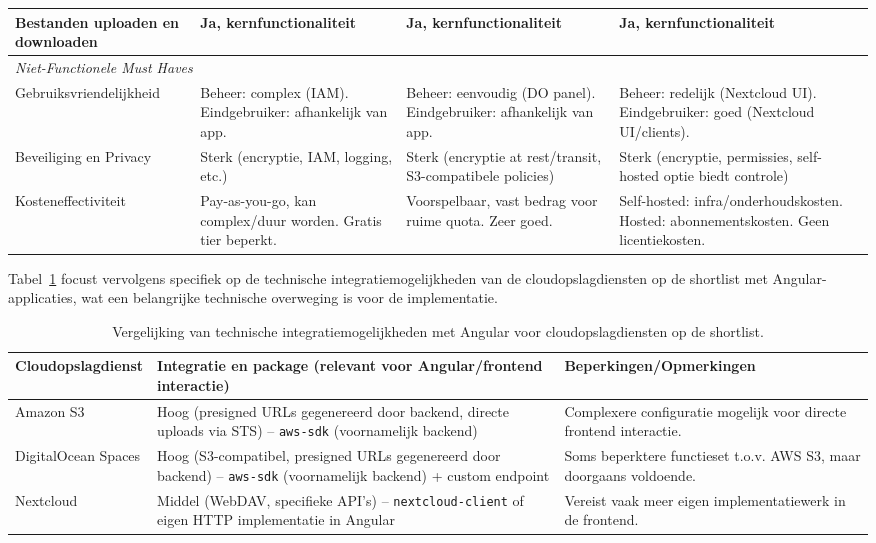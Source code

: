 \begin{table}[htbp]
\begin{tabularx}{\textwidth}{l >{\raggedright\arraybackslash}X >{\raggedright\arraybackslash}X >{\raggedright\arraybackslash}X}
      \midrule
      Bestanden uploaden en downloaden & Ja, kernfunctionaliteit & Ja, kernfunctionaliteit & Ja, kernfunctionaliteit \\
      \midrule
      \multicolumn{4}{l}{\textit{Niet-Functionele Must Haves}} \\
      Gebruiksvriendelijkheid & Beheer: complex (IAM). Eindgebruiker: afhankelijk van app. & Beheer: eenvoudig (DO panel). Eindgebruiker: afhankelijk van app. & Beheer: redelijk (Nextcloud UI). Eindgebruiker: goed (Nextcloud UI/clients). \\
      \midrule
      Beveiliging en Privacy & Sterk (encryptie, IAM, logging, etc.) & Sterk (encryptie at rest/transit, S3-compatibele policies) & Sterk (encryptie, permissies, self-hosted optie biedt controle) \\
      \midrule
      Kosteneffectiviteit & Pay-as-you-go, kan complex/duur worden. Gratis tier beperkt. & Voorspelbaar, vast bedrag voor ruime quota. Zeer goed. & Self-hosted: infra/onderhoudskosten. Hosted: abonnementskosten. Geen licentiekosten. \\
      \bottomrule
    \end{tabularx}
\end{table}

Tabel~\ref{tab:cloud-integratie-vergelijking-angular} focust vervolgens specifiek op de technische integratiemogelijkheden van de cloudopslagdiensten op de shortlist met Angular-applicaties, wat een belangrijke technische overweging is voor de implementatie.

\begin{table}[H]
    \centering
    \footnotesize
    \caption[Vergelijking technische integratiemogelijkheden met Angular]{\label{tab:cloud-integratie-vergelijking-angular}Vergelijking van technische integratiemogelijkheden met Angular voor cloudopslagdiensten op de shortlist.}
    \begin{tabularx}{\textwidth}{lXX}
        \toprule
        \textbf{Cloudopslagdienst} & \textbf{Integratie en package (relevant voor Angular/frontend interactie)} & \textbf{Beperkingen/Opmerkingen} \\
        \midrule
        Amazon S3 & Hoog (presigned URLs gegenereerd door backend, directe uploads via STS) – \texttt{aws-sdk} (voornamelijk backend) & Complexere configuratie mogelijk voor directe frontend interactie. \\
        DigitalOcean Spaces & Hoog (S3-compatibel, presigned URLs gegenereerd door backend) – \texttt{aws-sdk} (voornamelijk backend) + custom endpoint & Soms beperktere functieset t.o.v. AWS S3, maar doorgaans voldoende. \\
        Nextcloud & Middel (WebDAV, specifieke API's) – \texttt{nextcloud-client} of eigen HTTP implementatie in Angular & Vereist vaak meer eigen implementatiewerk in de frontend. \\
        \bottomrule
    \end{tabularx}
\end{table}


